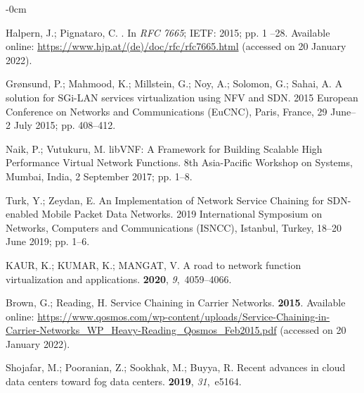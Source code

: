 \documentclass[futureinternet,review,accept,pdftex,moreauthors]{Definitions/mdpi}
\begin{document}
\begin{adjustwidth}{-\extralength}{0cm}
\begin{thebibliography}{999}
Halpern, J.; Pignataro, C.
. In {\em RFC 7665};
  {IETF:} %
  2015; pp. {1}%
--28. \newblock  Available online: \url{https://www.hjp.at/(de)/doc/rfc/rfc7665.html}{ (accessed on 20 January 2022).}

Gr{\o}nsund, P.; Mahmood, K.; Millstein, G.; Noy, A.; Solomon, G.; Sahai, A.
\newblock A solution for SGi-LAN services virtualization using NFV and SDN.
 2015 European Conference on Networks and Communications (EuCNC),  Paris, France, 29 June--2 July 2015; pp. 408--412.

Naik, P.; Vutukuru, M.
\newblock libVNF: A Framework for Building Scalable High Performance Virtual
  Network Functions.
 8th Asia-Pacific Workshop on Systems,  Mumbai, India, 2 September 2017; pp.
  1--8.

Turk, Y.; Zeydan, E.
\newblock An Implementation of Network Service Chaining for SDN-enabled Mobile
  Packet Data Networks.
 2019 International Symposium on Networks, Computers and
  Communications (ISNCC),  Istanbul, Turkey, 18--20 June 2019; pp. 1--6.

KAUR, K.; KUMAR, K.; MANGAT, V.
\newblock A road to network function virtualization and applications.
 {\bf 2020}, {\em
  9},~4059--4066.

Brown, G.; Reading, H.
\newblock Service Chaining in Carrier Networks.
 {\bf {2015}}. \newblock  Available online: \url{https://www.qosmos.com/wp-content/uploads/Service-Chaining-in-Carrier-Networks_WP_Heavy-Reading_Qosmos_Feb2015.pdf}{ (accessed on 20 January 2022).}

Shojafar, M.; Pooranian, Z.; Sookhak, M.; Buyya, R.
\newblock Recent advances in cloud data centers toward fog data centers.
 {\bf
  2019}, {\em 31},~e5164.


\end{thebibliography}
\end{adjustwidth}
\end{document}
